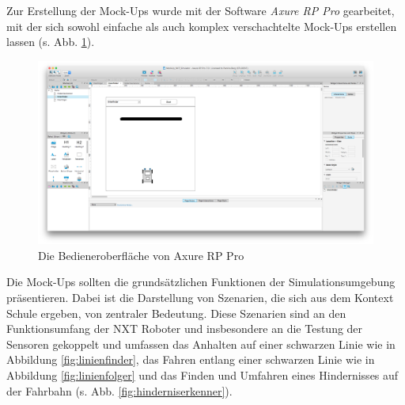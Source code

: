 \documentclass[paper=a4, DIV=calc, BCOR=12mm, twoside=on, onecolumn=on, open = right, titlepage =on, parskip =half-, headsepline = on, footsepline = off, chapterprefix = off, appendixprefix = on, fontsize = 12pt, numbers = noenddot, abstract = on]{scrbook}
\begin{document}
Zur Erstellung der Mock-Ups wurde mit der Software \emph{Axure RP Pro} gearbeitet, mit der sich sowohl einfache als auch komplex verschachtelte Mock-Ups erstellen lassen (s. Abb. \ref{fig:axure}).



\begin{figure}[htb]
\centering
\includegraphics[width=\textwidth]{images/axure_mockup.png} 
\caption{Die Bedieneroberfläche von Axure RP Pro}
\label{fig:axure}
\end{figure}

Die Mock-Ups sollten die grundsätzlichen Funktionen der Simulationsumgebung präsentieren. Dabei ist die Darstellung von Szenarien, die sich aus dem Kontext Schule ergeben, von zentraler Bedeutung. Diese Szenarien sind an den Funktionsumfang der NXT Roboter und insbesondere an die Testung der Sensoren gekoppelt und umfassen das Anhalten auf einer schwarzen Linie wie in Abbildung \ref{fig:linienfinder}, das Fahren entlang einer schwarzen Linie wie in Abbildung \ref{fig:linienfolger} und das Finden und Umfahren eines Hindernisses auf der Fahrbahn (s. Abb. \ref{fig:hinderniserkenner}).
\end{document}

